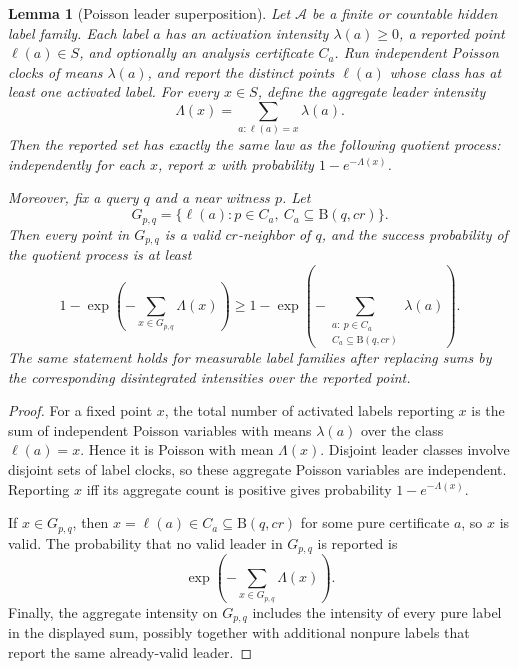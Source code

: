 \documentclass[10pt]{article}
\newtheorem{lemma}[theorem]{Lemma}
\theoremstyle{definition}
\newcommand{\Ball}{\mathrm{B}}
\begin{document}
\begin{lemma}[Poisson leader superposition]
   \label{lem:poisson-leader-superposition}
   Let \(\mathcal A\) be a finite or countable hidden label family.  Each
   label \(a\) has an activation intensity \(\lambda(a)\ge0\), a reported
   point \(\ell(a)\in S\), and optionally an analysis certificate \(C_a\).
   Run independent Poisson clocks of means \(\lambda(a)\), and report the
   distinct points \(\ell(a)\) whose class has at least one activated label.
   For every \(x\in S\), define the aggregate leader intensity
   \[
      \Lambda(x)=\sum_{a:\ell(a)=x}\lambda(a).
   \]
   Then the reported set has exactly the same law as the following quotient
   process: independently for each \(x\), report \(x\) with probability
   \(1-e^{-\Lambda(x)}\).

   Moreover, fix a query \(q\) and a near witness \(p\).  Let
   \[
      G_{p,q}=\{\ell(a):p\in C_a,\ C_a\subseteq\Ball(q,cr)\}.
   \]
   Then every point in \(G_{p,q}\) is a valid \(cr\)-neighbor of \(q\), and the
   success probability of the quotient process is at least
   \[
      1-\exp\!\left(
      -\sum_{x\in G_{p,q}}\Lambda(x)
      \right)
      \ge
      1-\exp\!\left(
      -\sum_{\substack{a:\ p\in C_a\\ C_a\subseteq\Ball(q,cr)}}\lambda(a)
      \right).
   \]
   The same statement holds for measurable label families after replacing
   sums by the corresponding disintegrated intensities over the reported point.
\end{lemma}

\begin{proof}
   For a fixed point \(x\), the total number of activated labels reporting
   \(x\) is the sum of independent Poisson variables with means
   \(\lambda(a)\) over the class \(\ell(a)=x\).  Hence it is Poisson with mean
   \(\Lambda(x)\).  Disjoint leader classes involve disjoint sets of label
   clocks, so these aggregate Poisson variables are independent.  Reporting
   \(x\) iff its aggregate count is positive gives probability
   \(1-e^{-\Lambda(x)}\).

   If \(x\in G_{p,q}\), then \(x=\ell(a)\in C_a\subseteq\Ball(q,cr)\) for some
   pure certificate \(a\), so \(x\) is valid.  The probability that no valid
   leader in \(G_{p,q}\) is reported is
   \[
      \exp\!\left(-\sum_{x\in G_{p,q}}\Lambda(x)\right).
   \]
   Finally, the aggregate intensity on \(G_{p,q}\) includes the intensity of
   every pure label in the displayed sum, possibly together with additional
   nonpure labels that report the same already-valid leader.
\end{proof}
\end{document}
